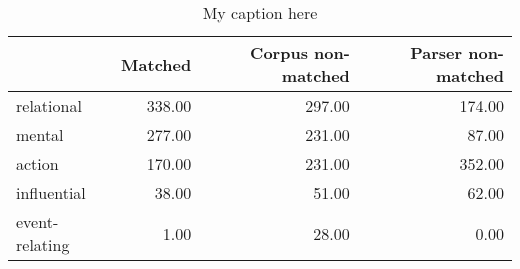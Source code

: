 \begin{table}[!ht]
\centering
\begin{tabular}{lrrr}
\toprule
{} &  Matched &  Corpus non-matched &  Parser non-matched \\
\midrule
relational     &   338.00 &              297.00 &              174.00 \\
mental         &   277.00 &              231.00 &               87.00 \\
action         &   170.00 &              231.00 &              352.00 \\
influential    &    38.00 &               51.00 &               62.00 \\
event-relating &     1.00 &               28.00 &                0.00 \\
\bottomrule
\end{tabular}
\caption{My caption here}
\label{tab:PROCESS_TYPE-oe-data}
\end{table}